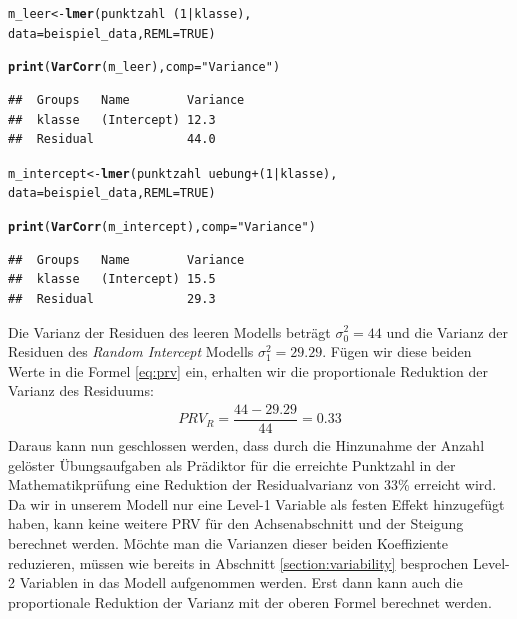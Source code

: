 \documentclass[12pt, a4paper]{article}\usepackage[]{graphicx}\usepackage[]{color}
\makeatletter
\newcommand{\hlnum}[1]{\textcolor[rgb]{0.686,0.059,0.569}{#1}}%
\newcommand{\hlstr}[1]{\textcolor[rgb]{0.192,0.494,0.8}{#1}}%
\newcommand{\hlopt}[1]{\textcolor[rgb]{0,0,0}{#1}}%
\newcommand{\hlstd}[1]{\textcolor[rgb]{0.345,0.345,0.345}{#1}}%
\newcommand{\hlkwb}[1]{\textcolor[rgb]{0.69,0.353,0.396}{#1}}%
\newcommand{\hlkwc}[1]{\textcolor[rgb]{0.333,0.667,0.333}{#1}}%
\newcommand{\hlkwd}[1]{\textcolor[rgb]{0.737,0.353,0.396}{\textbf{#1}}}%
\newenvironment{kframe}{%
 \def\at@end@of@kframe{}%
 \ifinner\ifhmode%
  \def\at@end@of@kframe{\end{minipage}}%
  \begin{minipage}{\columnwidth}%
 \fi\fi%
 \def\FrameCommand##1{\hskip\@totalleftmargin \hskip-\fboxsep
 \colorbox{shadecolor}{##1}\hskip-\fboxsep
     \hskip-\linewidth \hskip-\@totalleftmargin \hskip\columnwidth}%
 \MakeFramed {\advance\hsize-\width
   \@totalleftmargin\z@ \linewidth\hsize
   \@setminipage}}%
 {\par\unskip\endMakeFramed%
 \at@end@of@kframe}
\newenvironment{knitrout}{}{} %
\makeatother
\begin{document}
\singlespacing
\begin{knitrout}
\color{fgcolor}\begin{kframe}
\begin{alltt}
\hlstd{m_leer} \hlkwb{<-} \hlkwd{lmer}\hlstd{(punktzahl} \hlopt{~} \hlstd{(}\hlnum{1} \hlopt{|} \hlstd{klasse),}
                \hlkwc{data} \hlstd{= beispiel_data,} \hlkwc{REML} \hlstd{=} \hlnum{TRUE}\hlstd{)}

\hlkwd{print}\hlstd{(}\hlkwd{VarCorr}\hlstd{(m_leer),} \hlkwc{comp} \hlstd{=} \hlstr{"Variance"}\hlstd{)}
\end{alltt}
\begin{verbatim}
##  Groups   Name        Variance
##  klasse   (Intercept) 12.3    
##  Residual             44.0
\end{verbatim}
\begin{alltt}
\hlstd{m_intercept} \hlkwb{<-} \hlkwd{lmer}\hlstd{(punktzahl} \hlopt{~} \hlstd{uebung} \hlopt{+} \hlstd{(}\hlnum{1} \hlopt{|} \hlstd{klasse),}
                \hlkwc{data} \hlstd{= beispiel_data,} \hlkwc{REML} \hlstd{=} \hlnum{TRUE}\hlstd{)}

\hlkwd{print}\hlstd{(}\hlkwd{VarCorr}\hlstd{(m_intercept),} \hlkwc{comp} \hlstd{=} \hlstr{"Variance"}\hlstd{)}
\end{alltt}
\begin{verbatim}
##  Groups   Name        Variance
##  klasse   (Intercept) 15.5    
##  Residual             29.3
\end{verbatim}
\end{kframe}
\end{knitrout}



Die Varianz der Residuen des leeren Modells beträgt $\sigma_{0}^2 = 44$ und die Varianz der Residuen des \textit{Random Intercept} Modells $\sigma_{1}^2 = 29.29$. Fügen wir diese beiden Werte in die Formel \eqref{eq:prv} ein, erhalten wir die proportionale Reduktion der Varianz des Residuums:
\begin{equation} 
\begin{split}	
 PRV_{R} = \dfrac{44 - 29.29}{44} = 0.33
\end{split}	
\end{equation}
Daraus kann nun geschlossen werden, dass durch die Hinzunahme der Anzahl gelöster Übungsaufgaben als Prädiktor für die erreichte Punktzahl in der Mathematikprüfung eine Reduktion der Residualvarianz von 33\% erreicht wird. Da wir in unserem Modell nur eine Level-1 Variable als festen Effekt hinzugefügt haben, kann keine weitere PRV für den Achsenabschnitt und der Steigung berechnet werden. Möchte man die Varianzen dieser beiden Koeffiziente reduzieren, müssen wie bereits in Abschnitt \ref{section:variability} besprochen Level-2 Variablen in das Modell aufgenommen werden. Erst dann kann auch die proportionale Reduktion der Varianz mit der oberen Formel berechnet werden.
\end{document}
